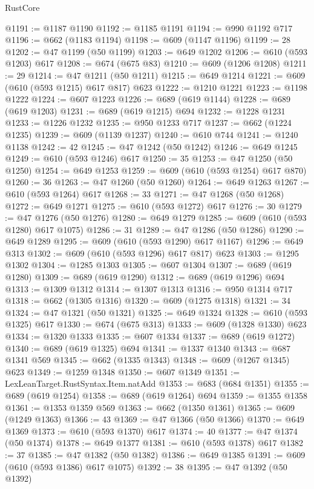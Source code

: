 \begin{lexlean}{RustCore}
\begin{coremodule}
@1191 := @1187 @1190
@1192 := @1185 @1191
@1194 := @990 @1192 @717
@1196 := @662 (@1183 @1194)
@1198 := @609 (@1147 @1196)
@1199 := 28
@1202 := @47 @1199 (@50 @1199)
@1203 := @649 @1202
@1206 := @610 (@593 @1203) @617
@1208 := @674 (@675 @83)
@1210 := @609 (@1206 @1208)
@1211 := 29
@1214 := @47 @1211 (@50 @1211)
@1215 := @649 @1214
@1221 := @609 (@610 (@593 @1215) @617 @817) @623
@1222 := @1210 @1221
@1223 := @1198 @1222
@1224 := @607 @1223
@1226 := @689 (@619 @1144)
@1228 := @689 (@619 @1203)
@1231 := @689 (@619 @1215) @694
@1232 := @1228 @1231
@1233 := @1226 @1232
@1235 := @950 @1233 @717
@1237 := @662 (@1224 @1235)
@1239 := @609 (@1139 @1237)
@1240 := @610 @744
@1241 := @1240 @1138
@1242 := 42
@1245 := @47 @1242 (@50 @1242)
@1246 := @649 @1245
@1249 := @610 (@593 @1246) @617
@1250 := 35
@1253 := @47 @1250 (@50 @1250)
@1254 := @649 @1253
@1259 := @609 (@610 (@593 @1254) @617 @870)
@1260 := 36
@1263 := @47 @1260 (@50 @1260)
@1264 := @649 @1263
@1267 := @610 (@593 @1264) @617
@1268 := 33
@1271 := @47 @1268 (@50 @1268)
@1272 := @649 @1271
@1275 := @610 (@593 @1272) @617
@1276 := 30
@1279 := @47 @1276 (@50 @1276)
@1280 := @649 @1279
@1285 := @609 (@610 (@593 @1280) @617 @1075)
@1286 := 31
@1289 := @47 @1286 (@50 @1286)
@1290 := @649 @1289
@1295 := @609 (@610 (@593 @1290) @617 @1167)
@1296 := @649 @313
@1302 := @609 (@610 (@593 @1296) @617 @817) @623
@1303 := @1295 @1302
@1304 := @1285 @1303
@1305 := @607 @1304
@1307 := @689 (@619 @1280)
@1309 := @689 (@619 @1290)
@1312 := @689 (@619 @1296) @694
@1313 := @1309 @1312
@1314 := @1307 @1313
@1316 := @950 @1314 @717
@1318 := @662 (@1305 @1316)
@1320 := @609 (@1275 @1318)
@1321 := 34
@1324 := @47 @1321 (@50 @1321)
@1325 := @649 @1324
@1328 := @610 (@593 @1325) @617
@1330 := @674 (@675 @313)
@1333 := @609 (@1328 @1330) @623
@1334 := @1320 @1333
@1335 := @607 @1334
@1337 := @689 (@619 @1272)
@1340 := @689 (@619 @1325) @694
@1341 := @1337 @1340
@1343 := @687 @1341 @569
@1345 := @662 (@1335 @1343)
@1348 := @609 (@1267 @1345) @623
@1349 := @1259 @1348
@1350 := @607 @1349
@1351 := LexLeanTarget.RustSyntax.Item.natAdd
@1353 := @683 (@684 @1351)
@1355 := @689 (@619 @1254)
@1358 := @689 (@619 @1264) @694
@1359 := @1355 @1358
@1361 := @1353 @1359 @569
@1363 := @662 (@1350 @1361)
@1365 := @609 (@1249 @1363)
@1366 := 43
@1369 := @47 @1366 (@50 @1366)
@1370 := @649 @1369
@1373 := @610 (@593 @1370) @617
@1374 := 40
@1377 := @47 @1374 (@50 @1374)
@1378 := @649 @1377
@1381 := @610 (@593 @1378) @617
@1382 := 37
@1385 := @47 @1382 (@50 @1382)
@1386 := @649 @1385
@1391 := @609 (@610 (@593 @1386) @617 @1075)
@1392 := 38
@1395 := @47 @1392 (@50 @1392)

\end{coremodule}
\end{lexlean}

